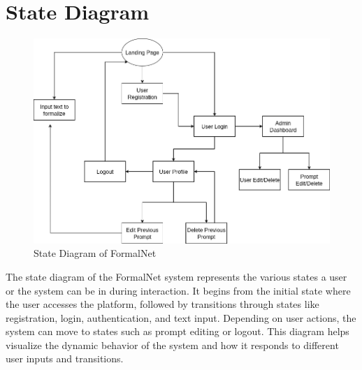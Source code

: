 \section{State Diagram}
\begin{figure}[H]
  \centering
  \includegraphics[width=1\textwidth]{images/formalnet state diagram.png}
  \caption{State Diagram of FormalNet}
  \label{fig:statediagram}
\end{figure}
The state diagram of the FormalNet system represents the various states a user or the system can be in during interaction. It begins from the initial state where the user accesses the platform, followed by transitions through states like registration, login, authentication, and text input. Depending on user actions, the system can move to states such as prompt editing or logout. This diagram helps visualize the dynamic behavior of the system and how it responds to different user inputs and transitions.



